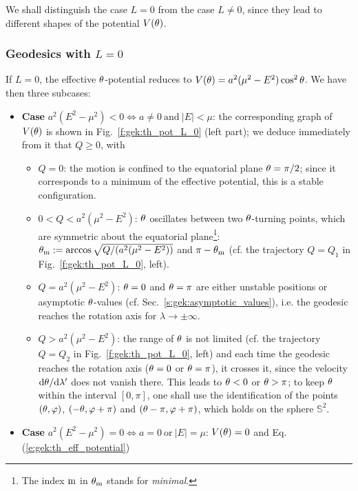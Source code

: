 We shall distinguish the
case $L=0$ from the case $L\not=0$, since they lead
to different shapes of the potential $V(\theta)$.



\subsubsection{Geodesics with $L=0$}

If $L=0$, the effective $\theta$-potential reduces to $V(\theta)=a^2(\mu^2 - E^2)\cos^2\theta$.
We have then three subcases:

\begin{itemize}
\item \textbf{Case} $a^2 (E^2 - \mu^2) < 0 \iff a\neq 0 \ \mbox{and}\ |E| < \mu$:
the corresponding graph of $V(\theta)$ is shown in
Fig.~\ref{f:gek:th_pot_L_0} (left part); we deduce immediately from it that
$Q\geq 0$, with
\begin{itemize}
\item $Q=0$: the motion is confined to the equatorial
plane $\theta=\pi/2$; since it corresponds to a minimum of the effective potential, this
is a stable configuration.
\item $0<Q< a^2(\mu^2 - E^2)$: $\theta$ oscillates between
two $\theta$-turning points, which are symmetric about the equatorial plane\footnote{The index ${\rm m}$
in $\theta_{\rm m}$ stands for \emph{minimal}.}:
$\theta_{\rm m} := \arccos\sqrt{Q/(a^2(\mu^2 - E^2))}$
and $\pi-\theta_{\rm m}$ (cf. the trajectory $Q=Q_1$ in Fig.~\ref{f:gek:th_pot_L_0}, left).
\item $Q = a^2(\mu^2 - E^2)$: $\theta=0$ and $\theta=\pi$
are either unstable positions or
asymptotic $\theta$-values (cf. Sec.~\ref{s:gek:asymptotic_values}), i.e.
the geodesic reaches the rotation axis for $\lambda\to\pm\infty$.
\item $Q > a^2(\mu^2 - E^2)$:
the range of $\theta$ is not limited (cf. the trajectory $Q=Q_2$ in Fig.~\ref{f:gek:th_pot_L_0}, left)
and each time the geodesic reaches the
rotation axis ($\theta=0$ or $\theta=\pi$),
it crosses it, since the velocity $\mathrm{d}\theta / \mathrm{d}\lambda'$
does not vanish there. This leads to $\theta < 0$ or $\theta > \pi$; to keep $\theta$
within the interval $[0,\pi]$, one shall use the identification
of the points $(\theta, \varphi)$, $(-\theta, \varphi+\pi)$ and $(\theta-\pi, \varphi+\pi)$,
which holds on the sphere $\mathbb{S}^2$.
\end{itemize}
\item \textbf{Case} $a^2 (E^2 - \mu^2) = 0 \iff a=0\ \mbox{or}\ |E|=\mu$:
$V(\theta)=0$ and Eq.(\ref{e:gek:th_eff_potential})

\end{itemize}
